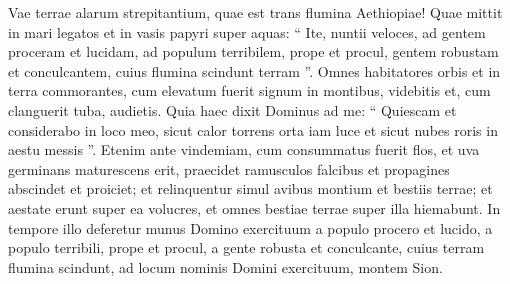 \begin{biblechapter}
\begin{biblechapter}
\begin{biblechapter}
\begin{biblechapter}
\begin{biblechapter}
\begin{biblechapter}
\begin{biblechapter}
\begin{biblechapter}
\begin{biblechapter}
\begin{biblechapter}
\begin{biblechapter}
\begin{biblechapter}
\begin{biblechapter}
\begin{biblechapter}
\begin{biblechapter}
\begin{biblechapter}
\begin{biblechapter}
\begin{biblechapter}
\verse Vae terrae alarum strepitantium,
 quae est trans flumina Aethiopiae!
 \verse Quae mittit in mari legatos
 et in vasis papyri super aquas:
 “ Ite, nuntii veloces,
 ad gentem proceram et lucidam,
 ad populum terribilem,
 prope et procul,
 gentem robustam et conculcantem,
 cuius flumina scindunt terram ”.
 \verse Omnes habitatores orbis
 et in terra commorantes,
 cum elevatum fuerit signum in montibus, videbitis
 et, cum clanguerit tuba, audietis.
 \verse Quia haec dixit Dominus ad me:
 “ Quiescam et considerabo in loco meo,
 sicut calor torrens orta iam luce
 et sicut nubes roris in aestu messis ”.
 \verse Etenim ante vindemiam, cum consummatus fuerit flos,
 et uva germinans maturescens erit,
 praecidet ramusculos falcibus
 et propagines abscindet et proiciet;
 \verse et relinquentur simul avibus montium
 et bestiis terrae;
 et aestate erunt super ea volucres,
 et omnes bestiae terrae super illa hiemabunt.
 \verse In tempore illo deferetur munus Domino exercituum a populo procero et lucido, a populo terribili, prope et procul, a gente robusta et conculcante, cuius terram flumina scindunt, ad locum nominis Domini exercituum, montem Sion.
 

\end{biblechapter}
\end{biblechapter}
\end{biblechapter}
\end{biblechapter}
\end{biblechapter}
\end{biblechapter}
\end{biblechapter}
\end{biblechapter}
\end{biblechapter}
\end{biblechapter}
\end{biblechapter}
\end{biblechapter}
\end{biblechapter}
\end{biblechapter}
\end{biblechapter}
\end{biblechapter}
\end{biblechapter}
\end{biblechapter}

